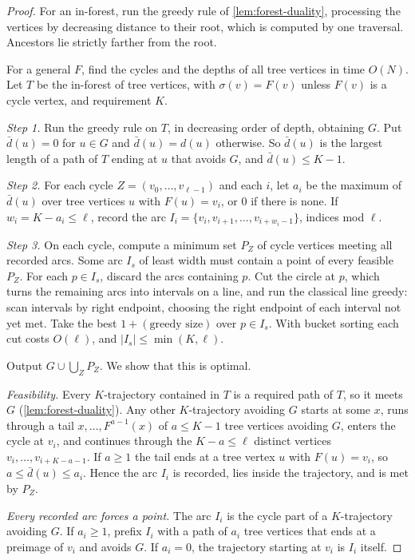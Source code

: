 \documentclass[11pt]{article}
\theoremstyle{definition}
\theoremstyle{remark}
\numberwithin{equation}{section}
\begin{document}
\begin{proof}
For an in-forest, run the greedy rule of \cref{lem:forest-duality},
processing the vertices by decreasing distance to their root, which is
computed by one traversal.  Ancestors lie strictly farther from the root.

For a general $F$, find the cycles and the depths of all tree vertices
in time $O(N)$.  Let $T$ be the in-forest of tree vertices, with
$\sigma(v)=F(v)$ unless $F(v)$ is a cycle vertex, and requirement $K$.

\emph{Step 1.}  Run the greedy rule on $T$, in decreasing order of depth,
obtaining $G$.  Put $\bar d(u)=0$ for $u\in G$ and $\bar d(u)=d(u)$
otherwise.  So $\bar d(u)$ is the largest length of a path of $T$ ending
at $u$ that avoids $G$, and $\bar d(u)\leq K-1$.

\emph{Step 2.}  For each cycle $Z=(v_0,\ldots,v_{\ell-1})$ and each $i$,
let $a_i$ be the maximum of $\bar d(u)$ over tree vertices $u$ with
$F(u)=v_i$, or $0$ if there is none.  If $w_i=K-a_i\leq\ell$, record the
arc $I_i=\{v_i,v_{i+1},\ldots,v_{i+w_i-1}\}$, indices mod $\ell$.

\emph{Step 3.}  On each cycle, compute a minimum set $P_Z$ of cycle
vertices meeting all recorded arcs.  Some arc $I_s$ of least width must
contain a point of every feasible $P_Z$.  For each $p\in I_s$, discard
the arcs containing $p$.  Cut the circle at $p$, which turns the
remaining arcs into intervals on a line, and run the classical line
greedy: scan intervals by right endpoint, choosing the right endpoint of
each interval not yet met.  Take the best $1+(\text{greedy size})$ over
$p\in I_s$.  With bucket sorting each cut costs $O(\ell)$, and
$|I_s|\leq\min(K,\ell)$.

Output $G\cup\bigcup_ZP_Z$.  We show that this is optimal.

\emph{Feasibility.}  Every $K$-trajectory contained in $T$ is a required
path of $T$, so it meets $G$ (\cref{lem:forest-duality}).  Any other
$K$-trajectory avoiding $G$ starts at some $x$, runs through a tail
$x,\ldots,F^{a-1}(x)$ of $a\leq K-1$ tree vertices avoiding $G$, enters
the cycle at $v_i$, and continues through the $K-a\leq\ell$ distinct
vertices $v_i,\ldots,v_{i+K-a-1}$.  If $a\geq1$ the tail ends at a tree
vertex $u$ with $F(u)=v_i$, so $a\leq\bar d(u)\leq a_i$.  Hence the arc
$I_i$ is recorded, lies inside the trajectory, and is met by $P_Z$.

\emph{Every recorded arc forces a point.}  The arc $I_i$ is the cycle
part of a $K$-trajectory avoiding $G$.  If $a_i\geq1$, prefix $I_i$ with
a path of $a_i$ tree vertices that ends at a preimage of $v_i$ and avoids
$G$.  If $a_i=0$, the trajectory starting at $v_i$ is $I_i$ itself.


\end{proof}
\end{document}
